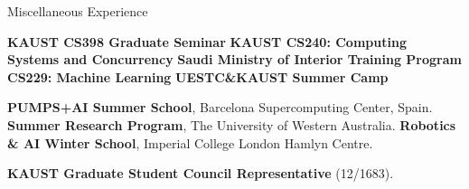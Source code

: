 \begin{rubric}{Miscellaneous Experience}

\entry*[2025 Spring] \textbf{KAUST CS398 Graduate Seminar}
 \textbf{KAUST CS240: Computing Systems and Concurrency}
\entry*[2023 Spring] \textbf{Saudi Ministry of Interior Training Program CS229: Machine Learning}
 \textbf{UESTC\&KAUST Summer Camp}


\entry*[2025 Summer] \textbf{PUMPS+AI Summer School}, Barcelona Supercomputing Center, Spain.
%
\entry*[2019 Summer] \textbf{Summer Research Program}, The University of Western Australia.
%
\entry*[2019 Winter] \textbf{Robotics \& AI Winter School}, Imperial College London Hamlyn Centre.

\entry*[2024-2025] \textbf{KAUST Graduate Student Council Representative} (12/1683).

\end{rubric}